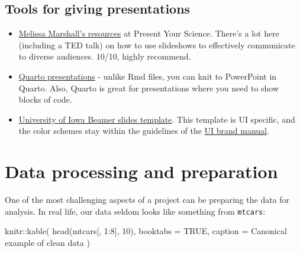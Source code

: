 \documentclass[
]{book}
\newenvironment{Shaded}{\begin{snugshade}}{\end{snugshade}}
\newcommand{\AttributeTok}[1]{\textcolor[rgb]{0.77,0.63,0.00}{#1}}
\newcommand{\ConstantTok}[1]{\textcolor[rgb]{0.00,0.00,0.00}{#1}}
\newcommand{\DecValTok}[1]{\textcolor[rgb]{0.00,0.00,0.81}{#1}}
\newcommand{\FunctionTok}[1]{\textcolor[rgb]{0.00,0.00,0.00}{#1}}
\newcommand{\NormalTok}[1]{#1}
\newcommand{\SpecialCharTok}[1]{\textcolor[rgb]{0.00,0.00,0.00}{#1}}
\newcommand{\StringTok}[1]{\textcolor[rgb]{0.31,0.60,0.02}{#1}}
\begin{document}
\hypertarget{tools-for-giving-presentations}{%
\section{Tools for giving presentations}\label{tools-for-giving-presentations}}

\begin{itemize}
\item
  \href{https://www.presentyourscience.com/resources}{Melissa Marshall's resources} at Present Your Science. There's a lot here (including a TED talk) on how to use slideshows to effectively communicate to diverse audiences. 10/10, highly recommend.
\item
  \href{https://quarto.org/docs/presentations/}{Quarto presentations} - unlike Rmd files, you can knit to PowerPoint in Quarto. Also, Quarto is great for presentations where you need to show blocks of code.
\item
  \href{https://github.com/tabpeter/ui_latex}{University of Iowa Beamer slides template}. This template is UI specific, and the color schemes stay within the guidelines of the \href{https://brand.uiowa.edu/color}{UI brand manual}.
\end{itemize}

\hypertarget{data-processing-and-preparation}{%
\chapter{Data processing and preparation}\label{data-processing-and-preparation}}

One of the most challenging aspects of a project can be preparing the data for analysis. In real life, our data seldom looks like something from \texttt{mtcars}:

\begin{Shaded}
\begin{Highlighting}[]
\NormalTok{knitr}\SpecialCharTok{::}\FunctionTok{kable}\NormalTok{(}
  \FunctionTok{head}\NormalTok{(mtcars[, }\DecValTok{1}\SpecialCharTok{:}\DecValTok{8}\NormalTok{], }\DecValTok{10}\NormalTok{),}
  \AttributeTok{booktabs =} \ConstantTok{TRUE}\NormalTok{,}
  \AttributeTok{caption =} \StringTok{\textquotesingle{}Canonical example of clean data\textquotesingle{}}
\NormalTok{)}
\end{Highlighting}
\end{Shaded}
\end{document}
